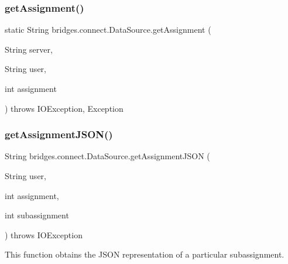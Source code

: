 \mbox{\label{classbridges_1_1connect_1_1_data_source_ac3487262c29278bf2e16da45adf3bc89}} 
\subsubsection{\texorpdfstring{get\+Assignment()}{getAssignment()}\hspace{0.1cm}{\footnotesize\ttfamily [2/2]}}
{\footnotesize\ttfamily static String bridges.\+connect.\+Data\+Source.\+get\+Assignment (\begin{DoxyParamCaption}\item[{String}]{server,  }\item[{String}]{user,  }\item[{int}]{assignment }\end{DoxyParamCaption}) throws I\+O\+Exception, Exception\hspace{0.3cm}{\ttfamily [static]}}

\mbox{\label{classbridges_1_1connect_1_1_data_source_af2f6cd7172acb64b2ba49f134b5391f8}} 
\subsubsection{\texorpdfstring{get\+Assignment\+J\+S\+O\+N()}{getAssignmentJSON()}\hspace{0.1cm}{\footnotesize\ttfamily [1/2]}}
{\footnotesize\ttfamily String bridges.\+connect.\+Data\+Source.\+get\+Assignment\+J\+S\+ON (\begin{DoxyParamCaption}\item[{String}]{user,  }\item[{int}]{assignment,  }\item[{int}]{subassignment }\end{DoxyParamCaption}) throws I\+O\+Exception}

This function obtains the J\+S\+ON representation of a particular subassignment.

